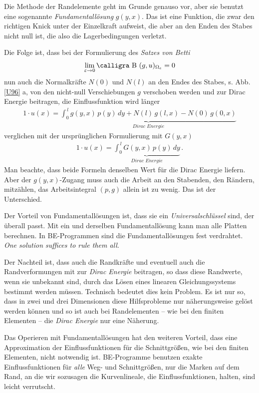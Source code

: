 {{{{Die Methode der Randelemente geht im Grunde genauso vor, aber sie benutzt eine sogenannte {\em Fundamentall\"{o}sung\/} $g(y,x)$. Das ist eine Funktion, die zwar den richtigen Knick unter der Einzelkraft aufweist, die aber an den Enden des Stabes nicht null ist, die also die Lagerbedingungen verletzt.

Die Folge ist, dass bei der Formulierung des {\em Satzes von Betti\/}
\begin{align}
\lim_{\varepsilon \to 0}\text{\normalfont\calligra B\,\,}(g,u)_{\Omega_e} = 0
\end{align}
nun auch die Normalkr\"{a}fte $N(0)$ und $N(l)$ an den Endes des Stabes, s. Abb. \ref{U96} a, von den \glq nicht-null\grq{} Verschiebungen $g$ verschoben werden und zur Dirac Energie beitragen, die Einflussfunktion wird \glq l\"{a}nger\grq{}
\begin{align}\label{Eq84}
1 \cdot u(x) = \underbrace{\int_0^{\,l} g(y,x)\,p(y)\,dy + N(l)\,g(l,x) - N(0)\,g(0,x)}_{Dirac\,\, Energie}
\end{align}
verglichen mit der urspr\"{u}nglichen Formulierung mit $G(y,x)$
\begin{align}
1 \cdot u(x) = \underbrace{\int_0^{\,l} G(y,x)\,p(y)\,dy}_{Dirac\,\, Energie} \,.
\end{align}
Man beachte, dass beide Formeln denselben Wert f\"{u}r die Dirac Energie liefern. Aber der $g(y,x)$-Zugang muss auch die Arbeit an den Stabenden, den R\"{a}ndern, mitz\"{a}hlen, das Arbeitsintegral $(p,g)$ allein ist \glq zu wenig\grq{}. Das ist der Unterschied.

Der Vorteil von Fundamentall\"{o}sungen ist, dass sie ein {\em Universalschl\"{u}ssel\/} sind, der \"{u}berall passt. Mit ein und derselben Fundamentall\"{o}sung kann man alle Platten berechnen. In BE-Programmen sind die Fundamentall\"{o}sungen \glq fest verdrahtet\grq{}. {\em One solution suffices to rule them all\/}.

Der Nachteil ist, dass auch die Randkr\"{a}fte und eventuell auch die Randverformungen mit zur {\em Dirac Energie\/} beitragen, so dass diese Randwerte, wenn sie unbekannt sind, durch das L\"{o}sen eines linearen Gleichungssystems bestimmt werden m\"{u}ssen. Technisch bedeutet dies kein Problem. Es ist nur so, dass in zwei und drei Dimensionen diese Hilfsprobleme nur n\"{a}herungsweise gel\"{o}st werden k\"{o}nnen und so ist auch bei Randelementen -- wie bei den finiten Elementen -- die {\em Dirac Energie\/} nur eine N\"{a}herung.

Das Operieren mit Fundamentall\"{o}sungen hat den weiteren Vorteil, dass eine Approximation der Einflussfunktionen f\"{u}r die Schnittgr\"{o}{\ss}en, wie bei den finiten Elementen, nicht notwendig ist.
BE-Programme benutzen exakte Einflussfunktionen f\"{u}r {\em alle\/} Weg- und Schnittgr\"{o}{\ss}en, nur die Marken auf dem Rand, an die wir sozusagen die Kurvenlineale, die Einflussfunktionen, halten, sind leicht verrutscht.


}}}}
